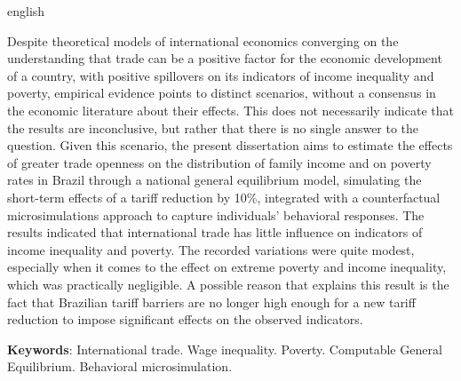 

\begin{resumo}[Abstract]
	\begin{otherlanguage*}{english}
		\SingleSpacing
		
		Despite theoretical models of international economics converging on the understanding that trade can be a positive factor for the economic development of a country, with positive spillovers on its indicators of income inequality and poverty, empirical evidence points to distinct scenarios, without a consensus in the economic literature about their effects. This does not necessarily indicate that the results are inconclusive, but rather that there is no single answer to the question. Given this scenario, the present dissertation aims to estimate the effects of greater trade openness on the distribution of family income and on poverty rates in Brazil through a national general equilibrium model, simulating the short-term effects of a tariff reduction by 10\%, integrated with a counterfactual microsimulations approach to capture individuals' behavioral responses. The results indicated that international trade has little influence on indicators of income inequality and poverty. The recorded variations were quite modest, especially when it comes to the effect on extreme poverty and income inequality, which was practically negligible. A possible reason that explains this result is the fact that Brazilian tariff barriers are no longer high enough for a new tariff reduction to impose significant effects on the observed indicators.
		
		\noindent 
		\textbf{Keywords}: International trade. Wage inequality. Poverty. Computable General Equilibrium. Behavioral microsimulation.
	\end{otherlanguage*}
\end{resumo}


